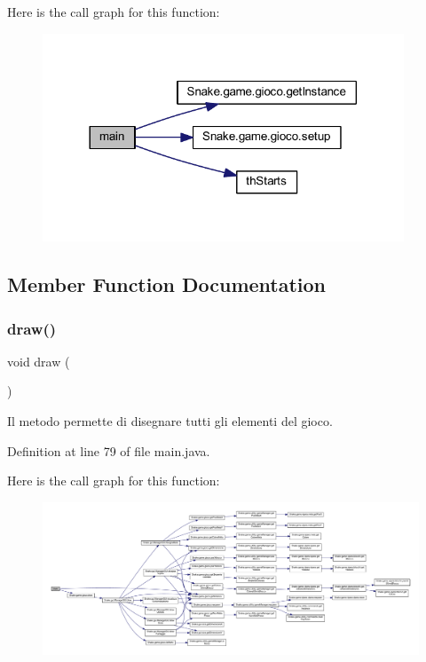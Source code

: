 Here is the call graph for this function\+:
\nopagebreak
\begin{figure}[H]
\begin{center}
\leavevmode
\includegraphics[width=305pt]{classmain_a51af30a60f9f02777c6396b8247e356f_cgraph}
\end{center}
\end{figure}


\subsection{Member Function Documentation}
\mbox{\label{classmain_a56c5cf8a568cff737ff95520cbe6b405}} 
\subsubsection{\texorpdfstring{draw()}{draw()}}
{\footnotesize\ttfamily void draw (\begin{DoxyParamCaption}{ }\end{DoxyParamCaption})}



Il metodo permette di disegnare tutti gli elementi del gioco. 



Definition at line 79 of file main.\+java.

Here is the call graph for this function\+:
\nopagebreak
\begin{figure}[H]
\begin{center}
\leavevmode
\includegraphics[width=350pt]{classmain_a56c5cf8a568cff737ff95520cbe6b405_cgraph}
\end{center}
\end{figure}
\mbox{\label{classmain_a908174a144ef32ef52d3cd01b7194f59}} 
